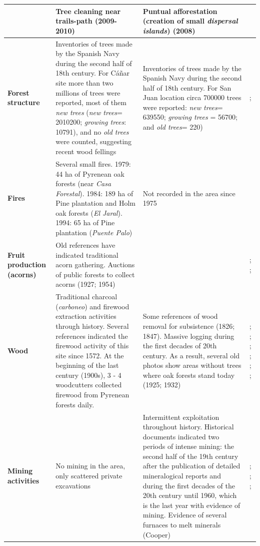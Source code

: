 \begin{table}
\begin{tabular}{
>{\centering\arraybackslash}p{}>{\raggedright\arraybackslash}p{}>{\raggedright\arraybackslash}p{}>{\raggedright\arraybackslash}p{}}
 & Tree cleaning near trails-path (2009-2010) & Puntual afforestation (creation of small \textit{dispersal islands}) (2008) &  \\ \midrule
\textbf{Forest structure} & Inventories of trees made by the Spanish Navy during the second half of 18th century. For Cáñar site more than two millions of trees were reported, most of them \textit{new trees} (\textit{new trees}= 2010200;  \textit{growing trees}: 10791), and no \textit{old trees} were counted, suggesting recent wood fellings & Inventories of trees made by the Spanish Navy during the second half of 18th century. For San Juan location circa 700000 trees were reported: \textit{new trees}= 639550;  \textit{growing trees} = 56700; and \textit{old trees}= 220) & \textcite{Cruz1991}; \textcite{Wing2015RootsEmpire} \\ \midrule
\textbf{Fires} & Several small fires. 1979: 44 ha of Pyrenean oak forests (near \textit{Casa Forestal}). 1984: 189 ha of Pine plantation and Holm oak forests (\textit{El Jaral}). 1994: 65 ha of Pine plantation (\textit{Puente Palo}) & Not recorded in the area since 1975 & \textcite{Bonet2014conama, MorenoLlorcaetal2016HistoricalAnalysis,CMA2018} \\ \midrule
\textbf{Fruit production (acorns)} & Old references have indicated traditional acorn gathering. Auctions of public forests to collect acorns (1927; 1954) &  & \textcite{Bonet2014conama}; \textcite{Catastro1752}; \textcite{MesaTorres2009} \\ \midrule
\textbf{Wood} & Traditional charcoal (\textit{carboneo}) and firewood extraction activities through history. Several references indicated the firewood activity of this site since 1572. At the beginning of the last century (1900s), 3 - 4 woodcutters collected firewood from Pyrenean forests daily. & Some references of wood removal for subsistence (1826; 1847). Massive logging during the first decades of 20th century. As a result, several old photos show areas without trees where oak forests stand today (1925; 1932) & \textcite{Bonet2014conama}; \textcite{Catastro1752}; \textcite{Ferrer1999}; \textcite{Lopez1776}; \textcite{MesaTorres2009}; \textcite{Madoz1846}; \textcite{Titos1997} \\ \midrule
\textbf{Mining activities} & No mining in the area, only scattered private excavations & Intermittent exploitation throughout history. Historical documents indicated two periods of intense mining: the second half of the 19th century after the publication of detailed mineralogical reports and during the first decades of the 20th century until 1960, which is the last year with evidence of mining. Evidence of several furnaces to melt minerals (Cooper) & \textcite{Maestre1852} ; \textcite{Maestre1858}; \textcite{MesaTorres2009}; \textcite{Titos1990} \\ \midrule

\end{tabular}
\end{table}
